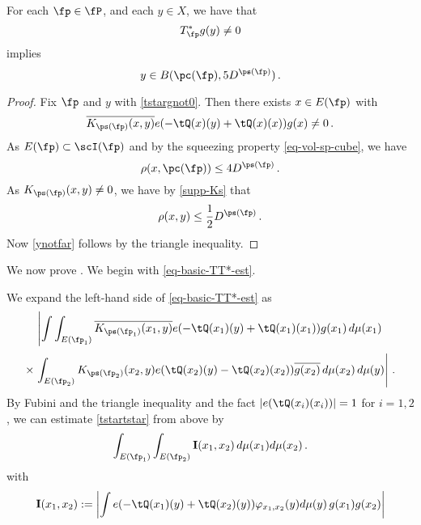 \begin{lemma}\label{tile-range-support}
    For each $\fp\in \fP$, and each $y\in X$, we have that
\begin{equation}\label{tstargnot0}
     T_{\fp}^* g(y)\neq 0
\end{equation}
   implies
\begin{equation}\label{ynotfar}
    y\in B(\pc(\fp),5D^{\ps(\fp)})\, .
\end{equation}
\end{lemma}
\begin{proof}
Fix $\fp$ and $y$ with \eqref{tstargnot0}.
Then there exists $x\in E(\fp)$ with
\begin{equation}
   \overline{K_{\ps(\fp)}(x,y)}e(-\tQ(x)(y)
    +\tQ(x)(x))g(x) \neq 0\, .
\end{equation}
As $E(\fp)\subset \scI(\fp)$ and by the squeezing property
\eqref{eq-vol-sp-cube}, we have
\begin{equation}
    \rho(x,\pc(\fp))\le 4D^{\ps(\fp)}\, .
\end{equation}
As $K_{\ps(\fp)}(x,y)\neq 0$, we have by \eqref{supp-Ks}
that
\begin{equation}
\rho(x,y)\le \frac 12 D^{\ps(\fp)}\, .
\end{equation}
Now \eqref{ynotfar} follows by the triangle inequality.
\end{proof}


We now prove . We begin with \eqref{eq-basic-TT*-est}.

We expand the left-hand side of \eqref{eq-basic-TT*-est} as
\begin{equation}\label{tstartstar}
\left|\int \int_{E(\fp_1)} \overline{K_{\ps(\fp_1)}(x_1,y)}e(-\tQ(x_1)(y)+
    \tQ(x_1)(x_1))g(x_1)\, d\mu(x_1) \right.
\end{equation}
\begin{equation}
 \times \left.\int_{E(\fp_2)} {K_{\ps(\fp_2)}(x_2,y)}e(\tQ(x_2)(y)
    -\tQ(x_2)(x_2))\overline{g(x_2)}\, d\mu(x_2)\, d\mu(y)\right|\, .
\end{equation}
By Fubini and the triangle inequality and
the fact $|e(\tQ(x_i)(x_i))|=1$ for $i=1,2$, we can estimate
\eqref{tstartstar} from above by
\begin{equation}\label{eqa1}
    \int_{E(\fp_1)} \int_{E(\fp_2)} {\bf I}(x_1, x_2)\, d\mu(x_1)d\mu(x_2)\,.
\end{equation}
with
\begin{equation}
    {\bf I}(x_1, x_2):=
    \left|\int
    e(-\tQ(x_1)(y)+\tQ(x_2)(y))\varphi_{x_1,x_2}(y)
    d\mu(y) \, g(x_1)g(x_2)\right|
\end{equation}


